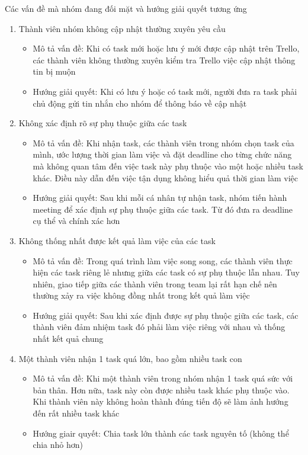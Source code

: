 \documentclass[a4paper, 12pt]{article}
\begin{document}
Các vấn đề mà nhóm đang đối mặt và hướng giải quyết tương ứng
\begin{enumerate}
    \item Thành viên nhóm không cập nhật thường xuyên yêu cầu
    \begin{itemize}
        \item Mô tả vấn đề: Khi có task mới hoặc lưu ý mới được cập nhật trên Trello, các thành viên không thường xuyên kiểm tra Trello việc cập nhật thông tin bị muộn
        \item Hướng giải quyết: Khi có lưu ý hoặc có task mới, người đưa ra task phải chủ động gửi tin nhắn cho nhóm để thông báo về cập nhật
    \end{itemize}

    \item Không xác định rõ sự phụ thuộc giữa các task
    \begin{itemize}
        \item Mô tả vấn đề: Khi nhận task, các thành viên trong nhóm chọn task của mình, ước lượng thời gian làm việc và đặt deadline cho từng chức năng mà không quan tâm đến việc task này phụ thuộc vào một hoặc nhiều task khác. Điều này dẫn đến việc tận dụng không hiểu quả thời gian làm việc
        \item Hướng giải quyết: Sau khi mỗi cá nhân tự nhận task, nhóm tiến hành meeting để xác định sự phụ thuộc giữa các task. Từ đó đưa ra deadline cụ thể và chính xác hơn
    \end{itemize}

    \item Không thống nhất được kết quả làm việc của các task 
    \begin{itemize}
        \item Mô tả vấn đề: Trong quá trình làm việc song song, các thành viên thực hiện các task riêng lẻ nhưng giữa các task có sự phụ thuộc lẫn nhau. Tuy nhiên, giao tiếp giữa các thành viên trong team lại rất hạn chế nên thường xảy ra việc không đồng nhất trong kết quả làm việc
        \item Hướng giải quyết: Sau khi xác định được sự phụ thuộc giữa các task, các thành viên đảm nhiệm task đó phải làm việc riêng với nhau và thống nhất kết quả chung
    \end{itemize}

    \item Một thành viên nhận 1 task quá lớn, bao gồm nhiều task con
    \begin{itemize}
        \item Mô tả vấn đề: Khi một thành viên trong nhóm nhận 1 task quá sức với bản thân. Hơn nữa, task này còn được nhiều task khác phụ thuộc vào. Khi thành viên này không hoàn thành đúng tiến độ sẽ làm ảnh hướng đến rất nhiều task khác
        \item Hướng giair quyết: Chia task lớn thành các task nguyên tố (không thể chia nhỏ hơn)
    \end{itemize}
\end{enumerate}
\end{document}
